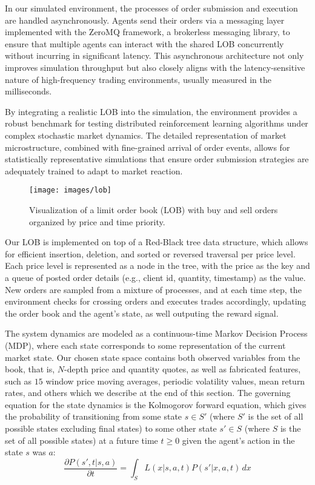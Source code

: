 \documentclass[11pt]{article}
\begin{document}
    In our simulated environment, the processes of order submission and execution are handled asynchronously.
    Agents send their orders via a messaging layer implemented with the ZeroMQ framework, a brokerless messaging library,
    to ensure that multiple agents can interact with the shared LOB concurrently without incurring in significant latency.
    This asynchronous architecture not only improves simulation throughput but also closely aligns with
    the latency-sensitive nature of high-frequency trading environments, usually measured in the milliseconds.

    By integrating a realistic LOB into the simulation, the environment provides a robust benchmark for testing
    distributed reinforcement learning algorithms under complex stochastic market dynamics.
    The detailed representation of market microstructure, combined with fine-grained arrival of order events,
    allows for statistically representative simulations that ensure order submission strategies
    are adequately trained to adapt to market reaction.

    \begin{figure}[htb]
        \centering
        \texttt{[image: images/lob]}
        \caption{Visualization of a limit order book (LOB) with buy and sell orders organized by price and time priority.}
        \label{fig:lob}
    \end{figure}

    Our LOB is implemented on top of a Red-Black tree data structure, which allows for efficient insertion, deletion,
    and sorted or reversed traversal per price level.
    Each price level is represented as a node in the tree, with the price as the key and a queue of posted order details
    (e.g., client id, quantity, timestamp) as the value.
    New orders are sampled from a mixture of processes, and at each time step, 
    the environment checks for crossing orders and executes trades accordingly,
    updating the order book and the agent's state, as well outputing the reward signal.

    The system dynamics are modeled as a continuous-time Markov Decision Process (MDP),
    where each state corresponds to some representation of the current market state.
    Our chosen state space contains both observed variables from the book, that is, $N$-depth price and quantity quotes,
    as well as fabricated features, such as $15$ window price moving averages,
    periodic volatility values, mean return rates, and others which we describe at the end of this section.
    The governing equation for the state dynamics is the Kolmogorov forward equation,
    which gives the probability of transitioning from some state $s \in S'$ 
    (where $S'$ is the set of all possible states excluding final states)
    to some other state $s' \in S$ (where $S$ is the set of all possible states)
    at a future time $t \geq 0$ given the agent's action in the state $s$ was $a$:
    \begin{equation}
        \frac{\partial P(s', t|s, a)}{\partial t} = \int_S L(x|s, a, t) P(s'|x, a, t) \, dx
        \label{eq:kolmogorov}
    \end{equation}
\end{document}
